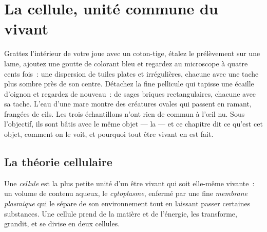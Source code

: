 \chapter{La cellule, unité commune du vivant}\label{ch:g10:cells-common-unit}

Grattez l'intérieur de votre joue avec un coton-tige, étalez le
prélèvement sur une lame, ajoutez une goutte de colorant bleu et
regardez au microscope à quatre cents fois~: une dispersion de tuiles
plates et irrégulières, chacune avec une tache plus sombre près de son
centre. Détachez la fine pellicule qui tapisse une écaille d'oignon et
regardez de nouveau~: de sages briques rectangulaires, chacune avec sa
tache. L'eau d'une mare montre des créatures ovales qui passent en
ramant, frangées de cils. Les trois échantillons n'ont rien de commun
à l'œil nu. Sous l'objectif, ils sont bâtis avec le même objet --- la
 --- et ce chapitre dit ce qu'est cet objet, comment on le voit,
et pourquoi tout être vivant en est fait.

\section{La théorie cellulaire}

\begin{definition}[Cellule]\label{def:g10:cells-common-unit:cell}
Une \emph{cellule} est la plus petite unité d'un être
vivant qui soit elle-même vivante~: un volume de contenu aqueux, le
\emph{cytoplasme}, enfermé par une fine
\emph{membrane plasmique} qui le sépare de
son environnement tout en laissant passer certaines substances. Une
cellule prend de la matière et de l'énergie, les transforme, grandit,
et se divise en deux cellules.
\end{definition}


